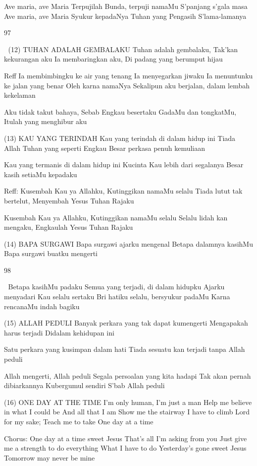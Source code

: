 \documentclass[10pt,a5paper,fancyhdr]{memoir}
\begin{document}
Ave maria, ave Maria 
Terpujilah Bunda, terpuji namaMu 
S’panjang s’gala masa 
Ave maria, ave Maria Syukur kepadaNya 
Tuhan yang Pengasih S’lama-lamanya 

97 



(12) TUHAN ADALAH GEMBALAKU 
Tuhan adalah gembalaku, Tak’kan kekurangan aku 
Ia membaringkan aku, Di padang yang berumput hijau 

Reff 
Ia membimbingku ke air yang tenang 
Ia menyegarkan jiwaku 
Ia menuntunku ke jalan yang benar 
Oleh karna namaNya 
Sekalipun aku berjalan, dalam lembah kekelaman 

Aku tidak takut bahaya, Sebab Engkau besertaku 
GadaMu dan tongkatMu, Itulah yang menghibur aku 

(13) KAU YANG TERINDAH 
Kau yang terindah di dalam hidup ini 
Tiada Allah Tuhan yang seperti Engkau 
Besar perkasa penuh kemuliaan 

Kau yang termanis di dalam hidup ini 
Kucinta Kau lebih dari segalanya 
Besar kasih setiaMu kepadaku 

Reff: 
Kusembah Kau ya Allahku, Kutinggikan namaMu selalu 
Tiada lutut tak bertelut, Menyembah Yesus Tuhan Rajaku 

Kusembah Kau ya Allahku, Kutinggikan namaMu selalu 
Selalu lidah kan mengaku, Engkaulah Yesus Tuhan Rajaku 

(14) BAPA SURGAWI 
Bapa surgawi ajarku mengenal 
Betapa dalamnya kasihMu 
Bapa surgawi buatku mengerti 

98 



Betapa kasihMu padaku 
Semua yang terjadi, di dalam hidupku 
Ajarku menyadari Kau selalu sertaku 
Bri hatiku selalu, bersyukur padaMu 
Karna rencanaMu indah bagiku 

(15) ALLAH PEDULI 
Banyak perkara yang tak dapat kumengerti 
Mengapakah harus terjadi 
Didalam kehidupan ini 

Satu perkara yang kusimpan dalam hati 
Tiada sesuatu kan terjadi tanpa Allah peduli 

Allah mengerti, Allah peduli 
Segala persoalan yang kita hadapi 
Tak akan pernah dibiarkannya 
Kubergumul sendiri 
S’bab Allah peduli 

(16) ONE DAY AT THE TIME 
I’m only human, I’m just a man 
Help me believe in what I could be 
And all that I am 
Show me the stairway I have to climb 
Lord for my sake; Teach me to take 
One day at a time 

Chorus: 
One day at a time sweet Jesus 
That’s all I’m asking from you 
Just give me a strength to do everything 
What I have to do 
Yesterday’s gone sweet Jesus 
Tomorrow may never be mine 
\end{document}
